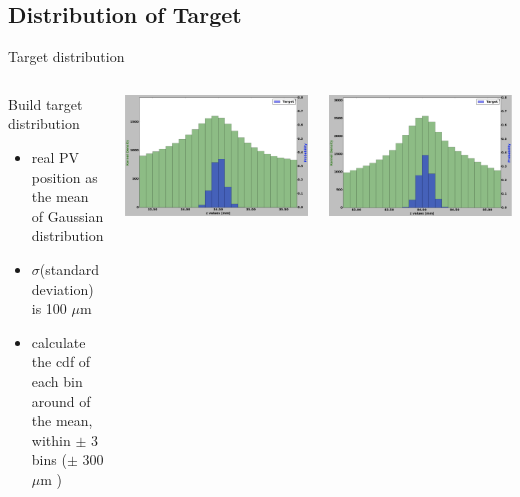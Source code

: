 \subsection{Distribution of Target}
\begin{frame}{Target distribution}
\begin{columns}[c]
    \begin{block}{Build target distribution}
      \begin{itemize}
          \item real PV position as the mean of Gaussian distribution
          \item $\sigma $(standard deviation) is 100 $\mu$m
          \item calculate the cdf of each bin around of the mean, within $\pm$ 3 bins ($\pm$ 300 $\mu$m )
      \end{itemize}
    \end{block}
    \begin{center}
            \includegraphics[width=1\textwidth,height=0.45\textwidth,trim=18 0 18 0]{images/T_1_12.png}

        \end{center}
      \begin{center}
    \includegraphics[width=1\textwidth,height=0.45\textwidth, trim=18 0 18 0]{images/T_2_12.png}


\end{center}
\end{columns}
\end{frame}
